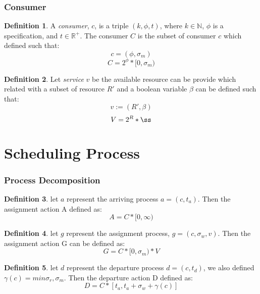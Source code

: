 \documentclass{article}
\theoremstyle{definition}
\newtheorem{definition}{Definition}[section]
\theoremstyle{remark}
\begin{document}
	\section{Consumer}
		
		\begin{definition}
			A \emph{consumer}, $c$, is a triple $(k, \phi, t)$, where $k \in \mathbb{N}$, $\phi$ is a specification, and $t \in \mathbb{R}^{+}$. The consumer $C$ is the subset of consumer $c$ which defined such that:
			\[
			c = (\phi , \sigma_m)
			\]
			\[
			C = 2^{\phi}*[0,\sigma_m)
			\]
		\end{definition}
		
		\begin{definition}
			Let \emph{service} $v$ be the available resource can be provide which related with a subset of resource $R'$ and a boolean variable $\beta$ can be defined such that:
			\[
			v := (R', \beta)
			\]
			\[
			V = 2^{R}*{\ss}
			\]
		\end{definition}
	
	\newpage
	
	\part{Scheduling Process}
	
	\section{Process Decomposition}
	
		\begin{definition}
			let $a$ represent the arriving process $a = (c, t_a)$. Then the assignment action A defined as:
			\[
			A = C * [0, \infty)
			\]
		\end{definition}
		
		\begin{definition}
			let $g$ represent the assignment process, $g = (c,\sigma_w, v)$. Then the assignment action G can be defined as:
			\[
			G = C*[0,\sigma_m)*V
			\]
		\end{definition}
		
		\begin{definition}
			let $d$ represent the departure process $d = (c, t_d)$, we also defined $\gamma(c) = min{\sigma_r,\sigma_m}.$ Then the departure action D defined as:
			\[
			D = C * [t_a, t_a + \sigma_w + \gamma(c)]
			\]
		\end{definition}
	
	\newpage
	
\end{document}
